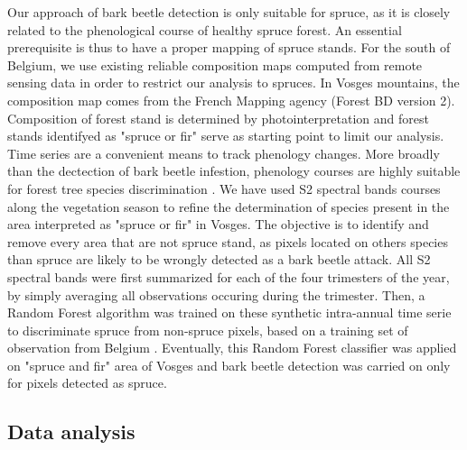 \documentclass[3p,times]{elsarticle}
\begin{document}
Our approach of bark beetle detection is only suitable for spruce, as it is closely related to the phenological course of healthy spruce forest.
An essential prerequisite is thus to have a proper mapping of spruce stands.
For the south of Belgium, we use existing reliable composition maps \citep{bolyn_forest_2018} computed from remote sensing data in order to restrict our analysis to spruces.
In Vosges mountains, the composition map comes from the French Mapping agency (Forest BD version 2). 
Composition of forest stand is determined by photointerpretation and forest stands identifyed as "spruce or fir" serve as starting point to limit our analysis.
Time series are a convenient means to track phenology changes. 
More broadly than the dectection of bark beetle infestion, phenology courses are highly suitable for forest tree species discrimination \citep{lisein_discrimination_2015,grabska_forest_2019,ma_tree_2021}.
We have used S2 spectral bands courses along the vegetation season to refine the determination of species present in the area interpreted as "spruce or fir" in Vosges.
The objective is to identify and remove every area that are not spruce stand, as pixels located on others species than spruce are likely to be wrongly detected as a bark beetle attack.
All S2 spectral bands were first summarized for each of the four trimesters of the year, by simply averaging all observations occuring during the trimester.
Then, a Random Forest algorithm was trained on these synthetic intra-annual time serie to discriminate spruce from non-spruce pixels, based on a training set of observation from Belgium \citep{bolyn_forest_2018}.
Eventually, this Random Forest classifier was applied on "spruce and fir" area of Vosges and bark beetle detection was carried on only for pixels detected as spruce. 






\subsection{Data analysis}


\end{document}
